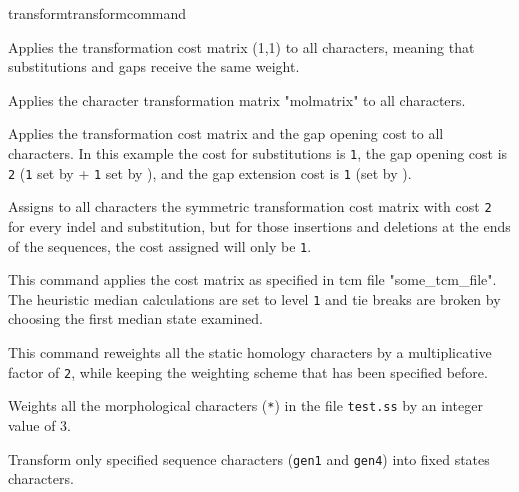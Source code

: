 \begin{command}{transform}{transformcommand}
	\begin{poyexamples} 
             	{Applies the transformation cost matrix (1,1) to all characters,
             	meaning that substitutions and gaps receive the same weight.}

           	 {Applies the character transformation matrix "molmatrix" to all
            	characters.}
            		
		{Applies the transformation cost matrix and the gap opening cost
		to all characters. In this example the cost for substitutions is \texttt{1},
		the gap opening cost is \texttt{2} (\texttt{1} set by 
		+ \texttt{1} set by ), and the gap extension cost is \texttt{1}
		(set by ).}
		
		{Assigns to all characters the symmetric transformation cost
		matrix with cost \texttt{2} for every indel and substitution, but for those
		insertions and deletions at the ends of the sequences, the cost
		assigned will only be \texttt{1}.}
		
		{This command applies the cost matrix as specified in tcm file 
		"some\_tcm\_file".  The heuristic median calculations are set to 
		level \texttt{1} and tie breaks are broken
		 by choosing the first median state examined.}
			 
            	{This command reweights all the static homology characters
            	by a multiplicative factor of \texttt{2}, while keeping the weighting
            	scheme that has been specified before.}
		
		
		
		{Weights all the morphological characters (\texttt{*}) in the file \texttt{test.ss} by an
		integer value of 3.}
		
           	{Transform only specified sequence characters (\texttt{gen1} and
           	\texttt{gen4}) into fixed states characters.}
	

\end{poyexamples}
\end{command}
